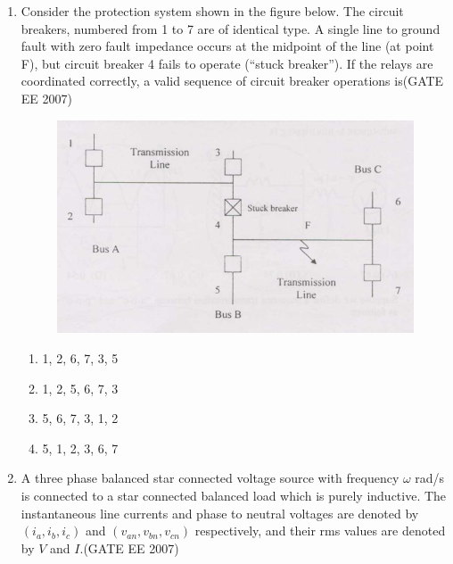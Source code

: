 \documentclass[a4paper,10pt]{exam}
\theoremstyle{remark}
\begin{document}
\begin{enumerate}
\begin{multicols}{4}
\begin{enumerate}
 \item 122 km
\item 172km
\item 222km
\item 272km
\end{enumerate}
\end{multicols}
\vfill
{}\\
\vspace{1cm}
\newpage

\item  \quad
Consider the protection system shown in the figure below. The circuit breakers, numbered from 1 to 7 are of identical type. A single line to ground fault with zero fault impedance occurs at the midpoint of the line (at point F), but circuit breaker 4 fails to operate (\textquotedblleft stuck breaker\textquotedblright). If the relays are coordinated correctly, a valid sequence of circuit breaker operations is\hfill{(GATE EE 2007)} 

\begin{figure}[H]
    \centering
    \includegraphics[width=0.75\linewidth]{figs/Q 28 2007.png}
    
\end{figure}
\begin{multicols}{4}
\begin{enumerate}
 \item 1, 2, 6, 7, 3, 5 
\item  1, 2, 5, 6, 7, 3 
\item 5, 6, 7, 3, 1, 2 
\item 5, 1, 2, 3, 6, 7
\end{enumerate}
\end{multicols}

\item \quad
A three phase balanced star connected voltage source with frequency $\omega$ rad/s is connected to a star connected balanced load which is purely inductive. The instantaneous line currents and phase to neutral voltages are denoted by $(i_a, i_b, i_c)$ and $(v_{an}, v_{bn}, v_{cn})$ respectively, and their rms values are denoted by $V$ and $I$.\hfill{(GATE EE 2007)} 


\end{enumerate}
\end{document}
